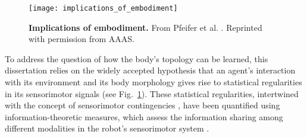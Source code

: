 \begin{figure}[t!]
	\begin{center}
		\texttt{[image: implications\_of\_embodiment]}
		\caption{\textbf{Implications of embodiment.} From Pfeifer et al. \cite{Pfeifer2007SelfOrganizationEmbodiment}. Reprinted with permission from AAAS.}
		\label{fig:implications_of_embodiment}
	\end{center}
\end{figure}
To address the question of how the body's topology can be learned, this dissertation relies on the widely accepted hypothesis that an agent's interaction with its environment and its body morphology gives rise to statistical regularities in its sensorimotor signals \cite{Pfeifer2006InformationTheoreticImplications,Pfeifer2007SelfOrganizationEmbodiment,LungarellaEmbodimentInformationCausal,Pfeifer2006Howbodyshapes} (see Fig.~\ref{fig:implications_of_embodiment}). These statistical regularities, intertwined with the concept of sensorimotor contingencies \cite{Jacquey2019Sensorimotorcontingenciesas}, have been quantified using information-theoretic measures, which assess the information sharing among different modalities in the robot's sensorimotor system \cite{Schmidt2013Bootstrappingperceptionusing,Lungarella2006Mappinginformationflow,Polani2009Modelsinformationprocessing,Bossomaier2016introductiontransferentropy,Olsson2006unknownsensorsactuators}. 
